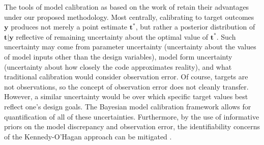 \documentclass[12pt]{article}
\begin{document}
%
%
%
%
%

The tools of model calibration as based on the work of \cite{Kennedy2001} retain their advantages under our proposed methodology.
%
Most centrally, calibrating to target outcomes $\mathbf y$ produces not merely a point estimate $\mathbf t^*$, but rather a posterior distribution of $\mathbf t|\mathbf y$ reflective of remaining uncertainty about the optimal value of $\mathbf t^*$.
%
Such uncertainty may come from parameter uncertainty (uncertainty about the values of model inputs other than the design variables), model form uncertainty (uncertainty about how closely the code approximates reality), and what traditional calibration would consider observation error.
%
Of course, targets are not observations, so the concept of observation error does not cleanly transfer.
%
However, a similar uncertainty would be over which specific target values best reflect one's design goals.
%
The Bayesian model calibration framework allows for quantification of all of these uncertainties.
%
Furthermore, by the use of informative priors on the model discrepancy and observation error, the identifiability concerns of the Kennedy-O'Hagan approach can be mitigated \citep{Bayarri2007,Tuo2016}.
%
\end{document}
